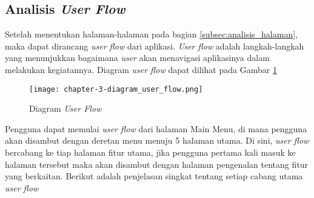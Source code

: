 
\subsection{Analisis \textit{User Flow}}
\label{subsec:analisis_user_flow}

Setelah menentukan halaman-halaman pada bagian \ref{subsec:analisis_halaman}, maka dapat dirancang \textit{user flow} dari aplikasi. \textit{User flow} adalah langkah-langkah yang menunjukkan bagaimana \textit{user} akan menavigasi aplikasinya dalam melakukan kegiatannya. Diagram \textit{user flow} dapat dilihat pada Gambar \ref{fig:diagram_user_flow}  

\begin{figure}[h]
  \centering
  \texttt{[image: chapter-3-diagram\_user\_flow.png]}
  \caption{Diagram \textit{User Flow}}
  \label{fig:diagram_user_flow}
\end{figure}
\FloatBarrier

Pengguna dapat memulai \textit{user flow} dari halaman Main Menu, di mana pengguna akan disambut dengan deretan menu menuju 5 halaman utama. Di sini, \textit{user flow} bercabang ke tiap halaman fitur utama, jika pengguna pertama kali masuk ke halaman tersebut maka akan disambut dengan halaman pengenalan tentang fitur yang berkaitan. Berikut adalah penjelasan singkat tentang setiap cabang utama \textit{user flow}

